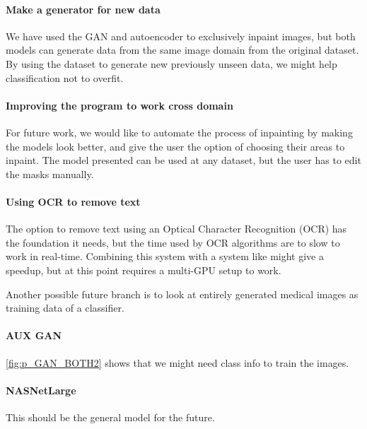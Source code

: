 \paragraph{Make a generator for new data}
We have used the GAN and autoencoder to exclusively inpaint images, but both models can generate data from the same image domain from the original dataset.
By using the dataset to generate new previously unseen data, we might help classification not to overfit.



\paragraph{Improving the program to work cross domain}
For future work, we would like to automate the process of inpainting by making the models look better, and give the user the option of choosing their areas to inpaint. The model presented can be used at any dataset, but the user has to edit the masks manually. 

\paragraph{Using OCR to remove text}
The option to remove text using an Optical Character Recognition (OCR) has the foundation it needs, but the time used by OCR algorithms are to slow to work in real-time. 
Combining this system with a system like  might give a speedup, but at this point requires a multi-GPU setup to work.

Another possible future branch is to look at entirely generated medical images as training data of a classifier. 


\paragraph{AUX GAN}
\ref{fig:p_GAN_BOTH2} shows that we might need class info to train the images.


\paragraph{NASNetLarge}
This should be the general model for the future.